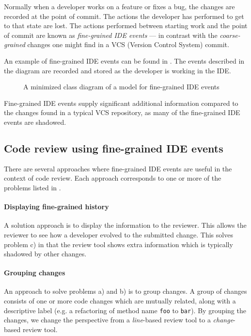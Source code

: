\documentclass[conference,a4paper]{IEEEtran}
\newcommand{\code}[1]{\texttt{#1}}
\begin{document}
Normally when a developer works on a feature or fixes a bug, the
changes are recorded at the point of commit. The actions the developer
has performed to get to that state are lost. The actions performed
between starting work and the point of commit are known as
\textit{fine-grained IDE events} --- in contrast with the
\textit{coarse-grained} changes one might find in a VCS (Version
Control System) commit.

An example of fine-grained IDE events can be found in
. The events described in the diagram
are recorded and stored as the developer is working in the IDE.
\begin{figure}[h]
  \centering
  \resizebox{!}{0.3\textheight}{%
    
  }
  \caption{A minimized class diagram of a model for fine-grained IDE
    events}
  \label{fig:ide-event-class-model}
\end{figure}

Fine-grained IDE events supply significant additional information
compared to the changes found in a typical VCS repository, as many of
the fine-grained IDE events are shadowed\cite{Nega12a}.

\subsection{Code review using fine-grained IDE events}
\label{sec:code-review-using-1}

There are several approaches where fine-grained IDE events are useful
in the context of code review. Each approach corresponds to one or
more of the problems listed in .

\paragraph{Displaying fine-grained history}

A solution approach is to display the information to the
reviewer. This allows the reviewer to see how a developer evolved to
the submitted change. This solves problem c) in that the review tool
shows extra information which is typically shadowed by other changes.

\paragraph{Grouping changes}

An approach to solve problems a) and b) %
is to group changes. A group of changes consists of one or more code
changes which are mutually related, along with a descriptive label
(e.g. a refactoring of method name \code{foo} to \code{bar}). By
grouping the changes, we change the perspective from a
\textit{line}-based review tool to a \textit{change}-based review
tool.
\end{document}
